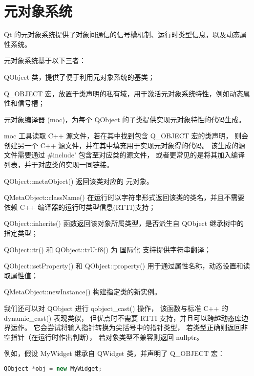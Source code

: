 \chapter{元对象系统}

Qt 的元对象系统提供了对象间通信的信号槽机制、运行时类型信息，以及动态属性系统。

元对象系统基于以下三者：

\begin{compactenum}
\item QObject 类，提供了便于利用元对象系统的基类；
\item Q\_OBJECT 宏，放置于类声明的私有域，用于激活元对象系统特性，例如动态属性和信号槽；
\item 元对象编译器 (moc)，为每个 QObject 的子类提供实现元对象特性的代码生成。
\end{compactenum}

moc 工具读取 C++ 源文件，若在其中找到包含 Q\_OBJECT 宏的类声明，
则会创建另一个 C++ 源文件，并在其中填充用于实现元对象得的代码。
该生成的源文件需要通过 \#include' 包含至对应类的源文件，
或者更常见的是将其加入编译列表，并于对应类的实现一同链接。

\begin{compactitem}
\item QObject::metaObject() 返回该类对应的 元对象。
\item QMetaObject::className() 在运行时以字符串形式返回该类的类名，并且不需要依赖 C++ 编译器的运行时类型信息(RTTI)支持；
\item QObject::inherits() 函数返回该对象所属类型，是否派生自 QObject 继承树中的指定类型；
\item QObject::tr() 和 QObject::trUtf8() 为 国际化 支持提供字符串翻译；
\item QObject::setProperty() 和 QObject::property() 用于通过属性名称，动态设置和读取属性值；
\item QMetaObject::newInstance() 构建指定类的新实例。
\end{compactitem}

我们还可以对 QObject 进行 qobject\_cast() 操作，
该函数与标准 C++ 的 dynamic\_cast() 表现类似，
但优点时不需要 RTTI 支持，并且可以跨越动态库边界运作。
它会尝试将输入指针转换为尖括号中的指针类型，
若类型正确则返回非空指针（在运行时作出判断），
若对象类型不兼容则返回 nullptr。

例如，假设 MyWidget 继承自 QWidget 类，并声明了 Q\_OBJECT 宏：

\begin{lstlisting}[language=C++]
QObject *obj = new MyWidget;
\end{lstlisting}

